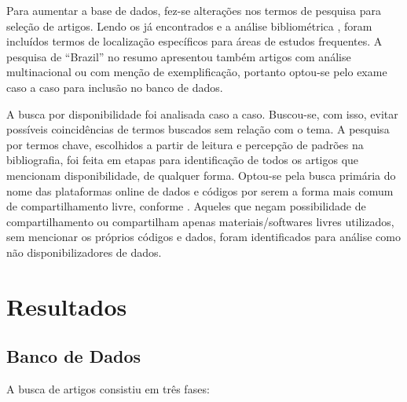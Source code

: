\documentclass[onecolumn, A4]{article}
\begin{document}
Para aumentar a base de dados, fez-se alterações nos termos de pesquisa para seleção 
de artigos. Lendo os já encontrados e a análise bibliométrica \cite{Dias2021},
foram incluídos termos de localização específicos para áreas de estudos frequentes.
A pesquisa de ``Brazil'' no resumo apresentou também artigos com análise multinacional 
ou com menção de exemplificação, portanto optou-se pelo exame caso a caso para 
inclusão no banco de dados. 

A busca por disponibilidade foi analisada caso a caso. Buscou-se, com isso, evitar possíveis 
coincidências de termos buscados sem relação com o tema. A pesquisa por termos
chave, escolhidos a partir de leitura e percepção de padrões na bibliografia,
foi feita em etapas para identificação de todos os artigos que mencionam 
disponibilidade, de qualquer forma. Optou-se pela busca primária do nome das plataformas 
online de dados e códigos por serem a forma mais comum de compartilhamento livre, 
conforme \citet{Tedersoo2021}. Aqueles que negam possibilidade de compartilhamento 
ou compartilham apenas materiais/softwares livres  utilizados, sem mencionar os próprios códigos e dados,
foram identificados para análise como não disponibilizadores de dados. 

\section{Resultados}

\subsection{Banco de Dados}
A busca de artigos consistiu em três fases:
\end{document}
